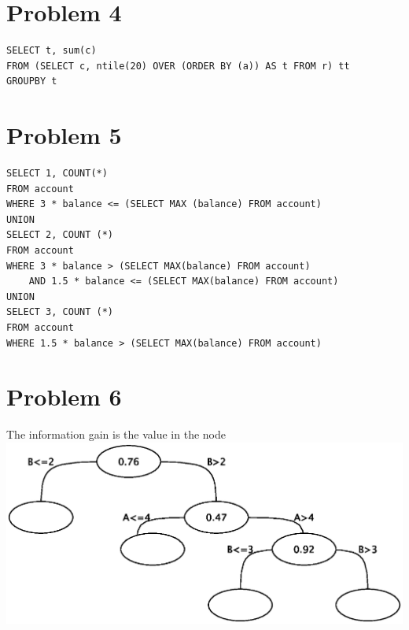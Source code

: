 \documentclass[a4paper,11pt]{article}
\begin{document}
\section*{Problem 4}
\begin{lstlisting}
SELECT t, sum(c)
FROM (SELECT c, ntile(20) OVER (ORDER BY (a)) AS t FROM r) tt
GROUPBY t
\end{lstlisting}
\newpage
\section*{Problem 5}
\begin{lstlisting}
SELECT 1, COUNT(*)
FROM account
WHERE 3 * balance <= (SELECT MAX (balance) FROM account)
UNION
SELECT 2, COUNT (*)
FROM account
WHERE 3 * balance > (SELECT MAX(balance) FROM account)
	AND 1.5 * balance <= (SELECT MAX(balance) FROM account)
UNION
SELECT 3, COUNT (*)
FROM account
WHERE 1.5 * balance > (SELECT MAX(balance) FROM account)
\end{lstlisting}
\section*{Problem 6}
The information gain is the value in the node\\
\includegraphics[scale=0.7]{fig.eps}
\end{document}
